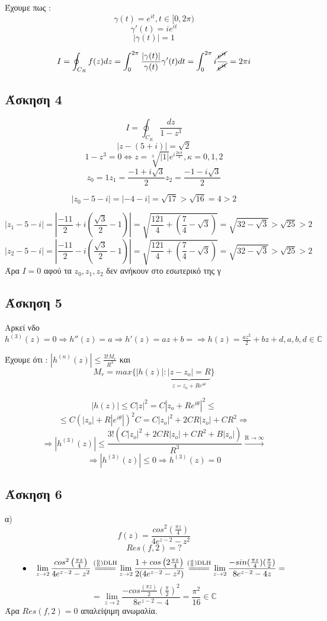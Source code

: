 \documentclass[12pt]{article}
\begin{document}
Έχουμε πως :
$$
\gamma(t)= e^{it}, t \in [0, 2\pi) $$$$
\gamma'(t)=ie^{it}
$$$$
|\gamma(t)|=1
$$

$$I = \oint_{C_R} f(z) dz  
= \int_{0}^{2\pi} \frac{|\gamma(t)|}{\gamma(t)}\gamma'(t)dt
=\int_{0}^{2\pi} i\frac{\cancel{e^{it}}}{\cancel{e^{it}}}=2 \pi i
$$

\newpage
 \subsection{Άσκηση 4}
$$I = \oint_{C_R} \frac{dz}{1-z^3} $$
$$
|z-(5+i)|= \sqrt{2}
$$
$$
1-z^3=0 \Leftrightarrow z=\sqrt[3]{|1|} e^{i\frac{2 \kappa \pi }{3}} ,\kappa ={0,1,2} 
$$
$$
z_0 = 1 
z_1 = \frac{-1+i\sqrt{3}}{2}
z_2 = \frac{-1-i\sqrt{3}}{2}
$$

$$
|z_0-5-i|=|-4-i|=\sqrt{17} > \sqrt{16} = 4 > 2
$$

$$
|z_1-5-i|=\left|\frac{-11}{2}+ i(\frac{\sqrt{3}}{2}-1)\right|=\sqrt{\frac{121}{4}+\left(\frac{7}{4}-\sqrt{3}\right)}=\sqrt{32-\sqrt{3}} > \sqrt{25}>2
$$
$$
|z_2-5-i|=\left|\frac{-11}{2}- i(\frac{\sqrt{3}}{2}-1)\right|=\sqrt{\frac{121}{4}+\left(\frac{7}{4}-\sqrt{3}\right)}=\sqrt{32-\sqrt{3}} > \sqrt{25}>2
$$
Άρα $I=0$ αφού τα $z_0, z_1 ,z_2 $ δεν ανήκουν στο εσωτερικό της γ

\newpage
 \subsection{Άσκηση 5}

Αρκεί νδο $h^{(3)}(z)=0\Rightarrow h''(z)=a\Rightarrow
h'(z)=az+b=\Rightarrow h(z)=\frac{az^2}{2}+bz+d ,a,b,d\in \mathbb{C}
$ 

Έχουμε ότι : $|h^{(n)}(z)|\leqslant \frac{3!M_r}{R^3}$ και 
\[
M_r=max\{|h(z)|:
\underbrace{|z-z_o|=R}_{\text{$z=z_o+Re^{i\theta}$}}
\}
\]

$$
|h(z)|\leqslant C|z|^2=C|z_o+Re^{i\theta}|^2\leqslant$$$$
\leqslant
C(|z_o|+R|e^{i\theta}|)^2C=C|z_o|^2+2CR|z_o|+CR^2 \Rightarrow$$
$$\Rightarrow
|h^{(3)}(z)|\leqslant\frac{3!(
C|z_o|^2+2CR|z_o|+CR^2+B|z_o|)}{R^3}
\overset{\mathrm{R\rightarrow \infty}}{\rightarrow}
$$
$$
\Rightarrow
|h^{(3)}(z)|\leqslant0 \Rightarrow h^{(3)}(z)
=0
$$
 \subsection{Άσκηση 6}
α)$$f(z)=\frac{cos^2\left(\frac{\pi z}{4}\right)} {4e^{z-2}-z^2}
$$
$$Res(f,2)= ?$$
$$
\bullet \quad \lim_{z \rightarrow 2}
\frac{cos^2\left(\frac{\pi z}{4}\right)} {4e^{z-2}-z^2}
\overset{\mathrm{(\frac{0}{0})DLH}}{=\joinrel=\joinrel=\joinrel=}
\lim_{z \rightarrow 2} \frac{1+cos\left(2\frac{\pi z}{4}\right)} {2(4e^{z-2}-z^2)}
\overset{\mathrm{(\frac{0}{0})DLH}}{=\joinrel=\joinrel=\joinrel=}
\lim_{z \rightarrow 2} 
\frac{-sin(\frac{\pi z}{4})(\frac{\pi}{2})}{8e^{z-2}-4z}
=$$
$$=
\lim_{z \rightarrow 2} \frac{-cos\frac{(\pi z)}{2}(\frac{\pi}{2})^2}{8e^{z-2}-4}=\frac{\pi ^2}{16} \in \mathbb{C}
$$
Άρα $\boxed {Res(f,2)=0}$ απαλείψιμη ανωμαλία.
\end{document}
